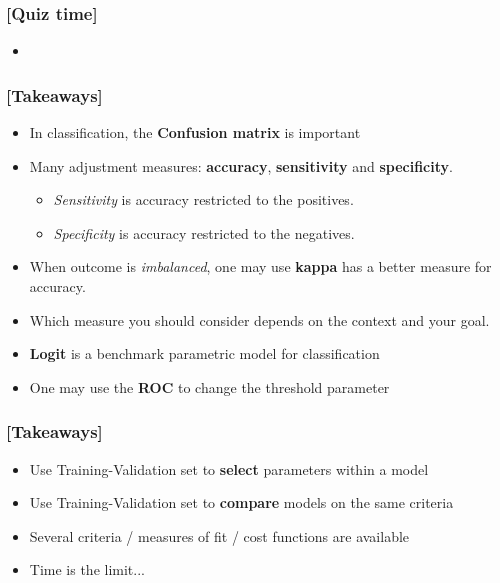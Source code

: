 \documentclass[xcolor=x11names,compress, handhouts]{beamer}
\renewcommand{\(}{\begin{columns}}
\renewcommand{\)}{\end{columns}}
\newcommand{\<}[1]{\begin{column}{#1}}
\renewcommand{\>}{\end{column}}
\begin{document}

\begin{frame} %
\frametitle{\textcolor{brique}{[Quiz time]}}
\pause
\begin{itemize}[<+->]
  \item[]
\end{itemize}
\end{frame}



\begin{frame} %
\frametitle{\textcolor{brique}{[Takeaways]}}
\begin{itemize}[<+->]
\item In classification, the \textbf{Confusion matrix} is important
 \item Many adjustment measures:  \textbf{accuracy}, \textbf{sensitivity} and \textbf{specificity}.
    \begin{itemize}[<+->]
      \item \textit{Sensitivity} is accuracy restricted to the positives.
      \item \textit{Specificity} is accuracy restricted to the negatives.
   \end{itemize}
 \item When  outcome is \textit{imbalanced}, one may use \textbf{kappa} has a better measure for accuracy.
  \item[] Which measure you should consider depends on the context and your goal.
 \item \textbf{Logit} is a benchmark parametric model for classification
 \item[] One may use the \textbf{ROC} to change the threshold parameter
\end{itemize}
\end{frame}


\begin{frame} %
\frametitle{\textcolor{brique}{[Takeaways]}}
\begin{itemize}[<+->]
  \item Use Training-Validation set to \textbf{select} parameters within a model
  \item Use Training-Validation set to \textbf{compare} models on the same criteria
  \item Several criteria / measures of fit / cost functions are available
  \item Time is the limit...
\end{itemize}
\end{frame}


\end{document}
